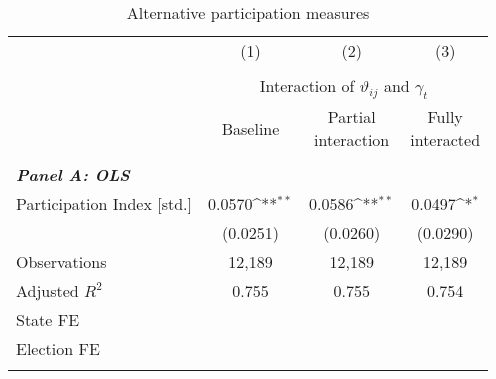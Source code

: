 \begin{table}[H]\centering
	\begin{threeparttable}
		\caption{Alternative participation measures}\label{tab_greta_cons:alternative_participation_measures}
		{\def\sym#1{\ifmmode^{#1}\else\(^{#1}\)\fi} 
			\begin{tabular}{l*{3}{c}}
				\toprule
				&\multicolumn{1}{c}{(1)}&\multicolumn{1}{c}{(2)}&\multicolumn{1}{c}{(3)}\\\\
				&\multicolumn{3}{c}{Interaction of $\vartheta_{ij}$ and $\gamma_t$}\\
				\cmidrule{2-4}
				& Baseline & \clb{c}{Partial\\interaction} & \clb{c}{Fully\\interacted} \\
				\midrule\\
				
				\multicolumn{4}{l}{\textbf{\textit{Panel A: OLS}}} \\
				Participation Index [std.]&      0.0570\sym{**} &      0.0586\sym{**} &      0.0497\sym{*}  \\  
				&    (0.0251)         &    (0.0260)         &    (0.0290)         \\  
				Observations      		&      12,189         &      12,189         &      12,189         \\  
				Adjusted $R^2$         	&       0.755         &       0.755         &       0.754         \\ 
				State FE				& \checkmark 		  & \checkmark       & \checkmark  \\
				Election FE				& \checkmark 		  & \checkmark       & \checkmark  \\
				\\ 
				

\end{tabular}}
\end{threeparttable}
\end{table}
